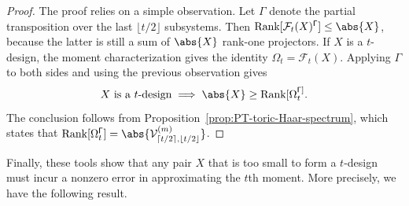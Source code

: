 \documentclass[aps,twocolumn,pra,superscriptaddress,nofootinbib]{revtex4-2}
\newcommand{\mF}{\mathcal{F}}
\begin{document}
\begin{proof}
   
The proof relies on a simple observation. Let $\mathsf{\Gamma}$ denote the
partial transposition over the last $\lfloor t/2\rfloor$ subsystems. Then
$\text{Rank}[\mF_{t}(X)^{\mathsf{\Gamma}}]\leq \abs{X}$, because the latter
is still a sum of $\abs{X}$ rank-one projectors. If $X$ is a
$t$-design, the moment characterization gives the identity
$\Omega_{t}=\mF_{t}(X)$. Applying $\mathsf{\Gamma}$ to both sides and using
the previous observation gives
\begin{equation}
       X \text{ is a $t$-design} \implies \abs{X}\geq \text{Rank}[\Omega_{t}^{\mathsf{\Gamma}]}.
\end{equation}
The conclusion follows from
Proposition~\ref{prop:PT-toric-Haar-spectrum}, which states that
$\text{Rank}[\Omega_{t}^{\mathsf{\Gamma}}]=
\abs{\mathcal{V}_{\lceil t/2\rceil,\lfloor t/2\rfloor}^{(m)}}$.
\end{proof}

Finally, these tools show that any pair $X$ that is too small to
form a $t$-design must incur a nonzero error in approximating the
$t$th moment. More precisely, we have the following result.
\end{document}
